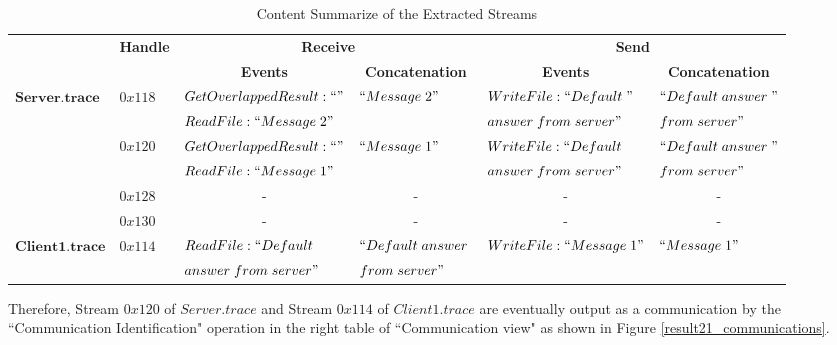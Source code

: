 \begin{table}[H]
  \tiny
  \centering
  \caption{Content Summarize of the Extracted Streams}
  \label{contentresult21}
  \begin{tabular}{|l|l|l|l|l|l|}
\hline            
& \multirow{2}{*}{\textbf{Handle}} & \multicolumn{2}{c|}{\textbf{Receive} }&\multicolumn{2}{c|}{\textbf{Send}} \\
\cline{3-6}
& &\multicolumn{1}{c|}{ \textbf{Events} }&\multicolumn{1}{c|}{\textbf{ Concatenation}}&\multicolumn{1}{c|}{ \textbf{Events} }&\multicolumn{1}{c|}{\textbf{ Concatenation}}\\
\hline 
\multirow{6}{*}{$\boldsymbol{Server.trace}$} &\multirow{2}{*}{$0x118$} & $GetOverlappedResult:``"$ & \multirow{2}{*}{$``Message\; 2"$} & $WriteFile:``Default\; "$ &  $``Default\; answer\; "$\\
\cline{3-3}
& &$ReadFile:``Message\; 2"$ &  & $answer\; from\; server"$&$from\; server"$\\
\cline{2-6}    
      &\multirow{2}{*}{$0x120$} & $GetOverlappedResult:``"$ & \multirow{2}{*}{$``Message\; 1"$} & $WriteFile:``Default\; $ &  $``Default\; answer\; "$\\
\cline{3-3}
& &$ReadFile:``Message\; 1"$ & &$answer\; from\; server"$ &$from\; server"$\\  
\cline{2-6}   
& $0x128$&\multicolumn{1}{c|}{- }&\multicolumn{1}{c|}{- } &\multicolumn{1}{c|}{- } &\multicolumn{1}{c|}{- }\\  
\cline{2-6}   
& $0x130$&\multicolumn{1}{c|}{- } &\multicolumn{1}{c|}{- } &\multicolumn{1}{c|}{- } &\multicolumn{1}{c|}{- }\\      
\hline  
\multirow{2}{*}{$\boldsymbol{Client1.trace}$ }&\multirow{2}{*}{$0x114$ }& $ReadFile: ``Default\; $ & $``Default\; answer\; $ & \multirow{2}{*}{$WriteFile:``Message\; 1"$ } &  \multirow{2}{*}{$``Message\; 1"$}\\
& &$answer\; from\; server"$& $ from\; server"$ & &\\
\hline
  \end{tabular}
\end{table}

Therefore, Stream $0x120$ of $Server.trace$ and Stream $0x114$ of $Client1.trace$ are eventually output as a communication by the ``Communication Identification" operation in the right table of ``Communication view" as shown in Figure \ref{result21_communications}. 

